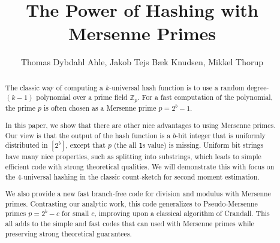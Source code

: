 

\title{The Power of Hashing with Mersenne Primes}
\author{Thomas Dybdahl Ahle, Jakob Tejs B\ae{}k Knudsen, Mikkel Thorup}


\maketitle

\begin{abstract}
The classic way of computing a $k$-universal hash function is to use a random degree-$(k-1)$ polynomial over a prime field $\mathbb Z_p$.
For a fast computation of the polynomial, the prime $p$ is often chosen as a Mersenne prime $p=2^b-1$.

In this paper, we show that there are other nice advantages to using Mersenne primes.
Our view is that the output of the hash function is a $b$-bit integer that is uniformly distributed in $[2^b]$, except that $p$ (the all \texttt1s value) is missing.
Uniform bit strings have many nice properties, such as splitting into substrings, which
leads to simple efficient code with strong theoretical qualities.
We will demonstrate this with focus on the 4-universal hashing in the classic count-sketch for second moment estimation.

We also provide a new fast branch-free code for division and modulus
with Mersenne primes. Contrasting our analytic work, this code
generalizes to Pseudo-Mersenne primes $p=2^b-c$ for small $c$,
improving upon a classical algorithm of Crandall.  This all
adds to the simple and fast codes that can used with Mersenne primes
while preserving strong theoretical guarantees.
\end{abstract}

\tableofcontents







% 












